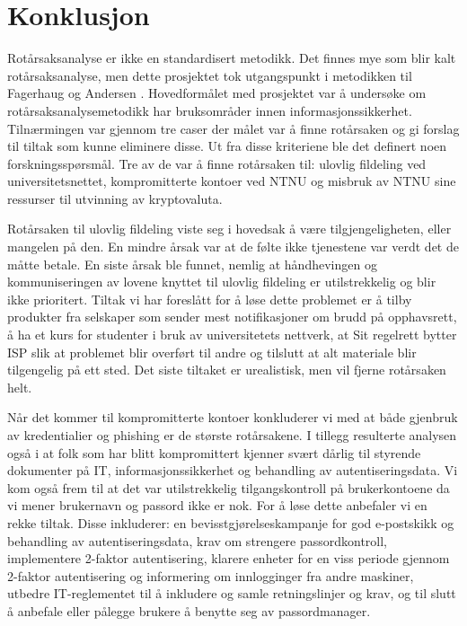 \chapter{Konklusjon}
\label{kap:konklusjon}
Rotårsaksanalyse er ikke en standardisert metodikk. Det finnes mye som blir kalt rotårsaksanalyse, men dette prosjektet tok utgangspunkt i metodikken til Fagerhaug og Andersen \cite{RCA}. Hovedformålet med prosjektet var å undersøke om rotårsaksanalysemetodikk har bruksområder innen informasjonssikkerhet. Tilnærmingen var gjennom tre caser der målet var å finne rotårsaken og gi forslag til tiltak som kunne eliminere disse. Ut fra disse kriteriene ble det definert noen forskningsspørsmål. Tre av de var å finne rotårsaken til: ulovlig fildeling ved universitetsnettet, kompromitterte kontoer ved NTNU og misbruk av NTNU sine ressurser til utvinning av kryptovaluta. 
\newline

\noindent Rotårsaken til ulovlig fildeling viste seg i hovedsak å være tilgjengeligheten, eller mangelen på den. En mindre årsak var at de følte ikke tjenestene var verdt det de måtte betale. En siste årsak ble funnet, nemlig at håndhevingen og kommuniseringen av lovene knyttet til ulovlig fildeling er utilstrekkelig og blir ikke prioritert. Tiltak vi har foreslått for å løse dette problemet er å tilby produkter fra selskaper som sender mest notifikasjoner om brudd på opphavsrett, å ha et kurs for studenter i bruk av universitetets nettverk, at Sit regelrett bytter ISP slik at problemet blir overført til andre og tilslutt at alt materiale blir tilgengelig på ett sted. Det siste tiltaket er urealistisk, men vil fjerne rotårsaken helt. 
\newline

\noindent Når det kommer til kompromitterte kontoer konkluderer vi med at både gjenbruk av kredentialier og phishing er de største rotårsakene. I tillegg resulterte analysen også i at folk som har blitt kompromittert kjenner svært dårlig til styrende dokumenter på IT, informasjonssikkerhet og behandling av autentiseringsdata. Vi kom også frem til at det var utilstrekkelig tilgangskontroll på brukerkontoene da vi mener brukernavn og passord ikke er nok. For å løse dette anbefaler vi en rekke tiltak. Disse inkluderer: en bevisstgjørelseskampanje for god e-postskikk og behandling av autentiseringsdata, krav om strengere passordkontroll, implementere 2-faktor autentisering, klarere enheter for en viss periode gjennom 2-faktor autentisering og informering om innlogginger fra andre maskiner, utbedre IT-reglementet til å inkludere og samle retningslinjer og krav, og til slutt å anbefale eller pålegge brukere å benytte seg av passordmanager. 
\newline


